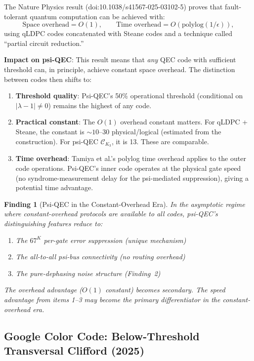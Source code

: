 \documentclass[11pt]{article}
\newtheorem{finding}[theorem]{Finding}
\theoremstyle{definition}
\theoremstyle{remark}
\newcommand{\CK}{\mathcal{C}_K}
\newcommand{\lamdiff}{|\lambda-1|}
\begin{document}
The Nature Physics result (doi:10.1038/s41567-025-03102-5) proves that
fault-tolerant quantum computation can be achieved with:
\begin{equation}
  \text{Space overhead} = O(1), \qquad
  \text{Time overhead} = O(\text{polylog}(1/\epsilon)),
\end{equation}
using qLDPC codes concatenated with Steane codes and a technique called
``partial circuit reduction.''

\textbf{Impact on psi-QEC}: This result means that \emph{any} QEC code
with sufficient threshold can, in principle, achieve constant space
overhead.  The distinction between codes then shifts to:
\begin{enumerate}[nosep]
  \item \textbf{Threshold quality}: Psi-QEC's 50\% operational threshold
    (conditional on $\lamdiff \neq 0$) remains the highest of any code.
  \item \textbf{Practical constant}: The $O(1)$ overhead constant matters.
    For qLDPC + Steane, the constant is $\sim 10$--$30$ physical/logical
    (estimated from the construction).  For psi-QEC $\CK_3$, it is 13.
    These are comparable.
  \item \textbf{Time overhead}: Tamiya et al.'s polylog time overhead
    applies to the outer code operations.  Psi-QEC's inner code operates
    at the physical gate speed (no syndrome-measurement delay for the
    psi-mediated suppression), giving a potential time advantage.
\end{enumerate}

\begin{finding}[Psi-QEC in the Constant-Overhead Era]
\label{finding:constant-overhead-era}
In the asymptotic regime where constant-overhead protocols are available
to all codes, psi-QEC's distinguishing features reduce to:
\begin{enumerate}[nosep]
  \item The $67^K$ per-gate error suppression (unique mechanism)
  \item The all-to-all psi-bus connectivity (no routing overhead)
  \item The pure-dephasing noise structure (Finding~2)
\end{enumerate}
The overhead advantage ($O(1)$ constant) becomes secondary.  The
\emph{speed} advantage from items 1--3 may become the primary differentiator
in the constant-overhead era.
\end{finding}

\subsection{Google Color Code: Below-Threshold Transversal Clifford (2025)}
\label{sec:google-color}
\end{document}
